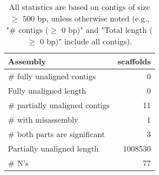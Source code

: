 \documentclass[12pt,a4paper]{article}
\begin{document}
\begin{table}[ht]
\begin{center}
\caption{All statistics are based on contigs of size $\geq$ 500 bp, unless otherwise noted (e.g., "\# contigs ($\geq$ 0 bp)" and "Total length ($\geq$ 0 bp)" include all contigs).}
\begin{tabular}{|l*{1}{|r}|}
\hline
Assembly & scaffolds \\ \hline
\# fully unaligned contigs & 0 \\ \hline
Fully unaligned length & 0 \\ \hline
\# partially unaligned contigs & 11 \\ \hline
\hspace{5mm}\# with misassembly & 1 \\ \hline
\hspace{5mm}\# both parts are significant & 3 \\ \hline
Partially unaligned length & 1008530 \\ \hline
\# N's & 77 \\ \hline
\end{tabular}
\end{center}
\end{table}
\end{document}
